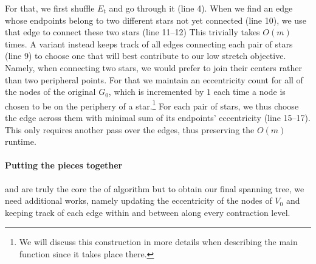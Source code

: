 For that, we first shuffle $E_t$ and go through it (line 4). When we find an edge whose endpoints
belong to two different stars not yet connected (line 10), we use that edge to connect these two
stars (line 11--12) This trivially takes $O(m)$ times.  A variant instead keeps track of all edges
connecting each pair of stars (line 9) to choose one that will best contribute to our low stretch
objective. Namely, when connecting two stars, we would prefer to join their centers rather than two
peripheral points. For that we maintain an eccentricity count for all of the nodes of the original
$G_0$, which is incremented by $1$ each time a node is chosen to be on the periphery of a
star.\footnote{We will discuss this construction in more details when describing the main \gtx{}
function since it takes place there.} For each pair of stars, we thus choose the edge across them
with minimal sum of its endpoints' eccentricity (line 15--17). This only requires another pass over the edges, thus preserving the
$O(m)$ runtime.

\paragraph{Putting the pieces together}\label{par:full_gtx}%
\extractStar{} and \collapseStar{} are truly the core the of \gtx{} algorithm but to obtain our
final spanning tree, we need additional works, namely updating the eccentricity of the nodes of
$V_0$ and keeping track of each edge within and between along every contraction level.

